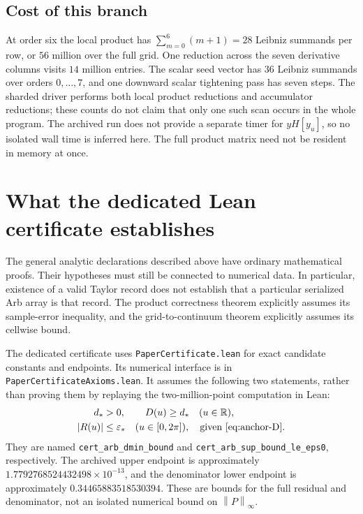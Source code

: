 \documentclass[11pt]{article}
\theoremstyle{definition}
\theoremstyle{remark}
\newcommand{\R}{\mathbb R}
\newcommand{\norminf}[1]{\left\|#1\right\|_{\infty}}
\newcommand{\code}[1]{\nolinkurl{#1}}
\numberwithin{equation}{section}
\begin{document}
\subsection{Cost of this branch}
At order six the local product has
$\sum_{m=0}^{6}(m+1)=28$ Leibniz summands per row, or $56$ million over
the full grid. One reduction across the seven derivative columns visits
$14$ million entries. The scalar seed vector has $36$ Leibniz summands
over orders $0,\ldots,7$, and one downward scalar tightening pass has
seven steps. The sharded driver performs both local product reductions
and accumulator reductions; these counts do not claim that only one such
scan occurs in the whole program. The archived run does not provide a
separate timer for $yH[y_u]$, so no isolated wall time is inferred here.
The full product matrix need not be resident in memory at once.

\section{What the dedicated Lean certificate establishes}
\label{sec:trust}

The general analytic declarations described above have ordinary
mathematical proofs. Their hypotheses must still be connected to numerical
data. In particular, existence of a valid Taylor record does not establish
that a particular serialized Arb array is that record. The product
correctness theorem explicitly assumes its sample-error inequality, and
the grid-to-continuum theorem explicitly assumes its cellwise bound.

The dedicated certificate uses
\code{PaperCertificate.lean} for exact
candidate constants and endpoints. Its numerical interface is in
\code{PaperCertificateAxioms.lean}.
It assumes the following two statements, rather than proving them by
replaying the two-million-point computation in Lean:
\begin{align}
 d_*&>0,\qquad D(u)\geq d_*\quad(u\in\R),\label{eq:anchor-D}\\
 |R(u)|&\leq\varepsilon_*\quad(u\in[0,2\pi]),
 \quad\text{given \eqref{eq:anchor-D}.}\label{eq:anchor-R}
\end{align}
They are named \code{cert_arb_dmin_bound} and
\code{cert_arb_sup_bound_le_eps0}, respectively. The archived upper
endpoint is approximately $1.7792768524432498\times10^{-13}$, and the
denominator lower endpoint is approximately $0.34465883518530394$.
These are bounds for the full residual and denominator, not an isolated
numerical bound on $\norminf{P}$.
\end{document}
